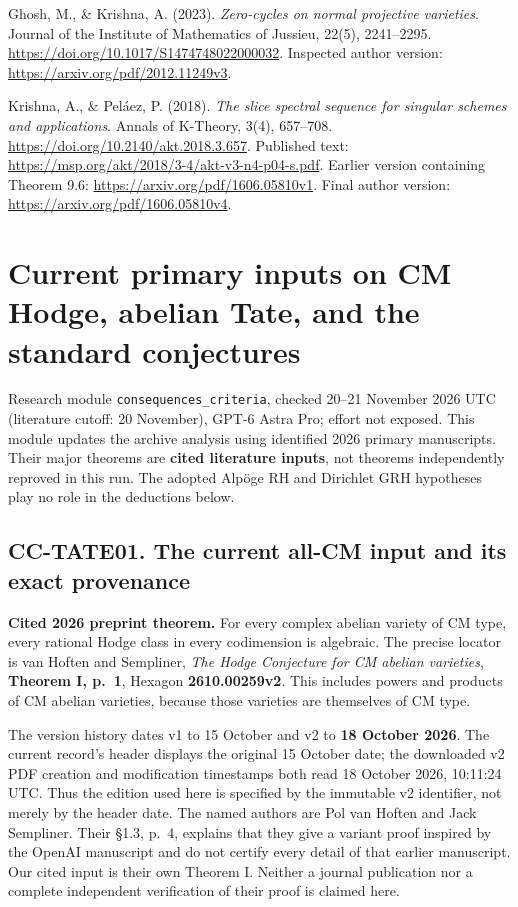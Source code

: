 \documentclass[11pt,a4paper]{article}
\theoremstyle{definition}\newtheorem{definition}[theorem]{Definition}
\theoremstyle{remark}\newtheorem{remark}[theorem]{Remark}
\begin{document}
Ghosh, M., \& Krishna, A. (2023).
\emph{Zero-cycles on normal projective varieties}.
Journal of the Institute of Mathematics of Jussieu, 22(5), 2241--2295.
\url{https://doi.org/10.1017/S1474748022000032}.
Inspected author version:
\url{https://arxiv.org/pdf/2012.11249v3}.

Krishna, A., \& Pel\'aez, P. (2018).
\emph{The slice spectral sequence for singular schemes and applications}.
Annals of K-Theory, 3(4), 657--708.
\url{https://doi.org/10.2140/akt.2018.3.657}.
Published text:
\url{https://msp.org/akt/2018/3-4/akt-v3-n4-p04-s.pdf}.
Earlier version containing Theorem 9.6:
\url{https://arxiv.org/pdf/1606.05810v1}.
Final author version:
\url{https://arxiv.org/pdf/1606.05810v4}.


\section{Current primary inputs on CM Hodge, abelian Tate, and the
standard
conjectures}\label{current-primary-inputs-on-cm-hodge-abelian-tate-and-the-standard-conjectures}

Research module \nolinkurl{consequences_criteria}, checked 20--21 November
2026 UTC (literature cutoff: 20 November), GPT-6 Astra Pro; effort not
exposed. This module updates the archive analysis using identified 2026
primary manuscripts. Their major theorems are \textbf{cited literature
inputs}, not theorems independently reproved in this run. The adopted
Alpöge RH and Dirichlet GRH hypotheses play no role in the deductions
below.

\subsection{CC-TATE01. The current all-CM input and its exact
provenance}\label{cc-tate01.-the-current-all-cm-input-and-its-exact-provenance}

\textbf{Cited 2026 preprint theorem.} For every complex abelian variety
of CM type, every rational Hodge class in every codimension is
algebraic. The precise locator is van Hoften and Sempliner, \emph{The
Hodge Conjecture for CM abelian varieties}, \textbf{Theorem I, p.~1},
Hexagon \textbf{2610.00259v2}. This includes powers and products of CM
abelian varieties, because those varieties are themselves of CM type.

The version history dates v1 to 15 October and v2 to \textbf{18 October
2026}. The current record's header displays the original 15 October
date; the downloaded v2 PDF creation and modification timestamps both
read 18 October 2026, 10:11:24 UTC. Thus the edition used here is
specified by the immutable v2 identifier, not merely by the header date.
The named authors are Pol van Hoften and Jack Sempliner. Their §1.3,
p.~4, explains that they give a variant proof inspired by the OpenAI
manuscript and do not certify every detail of that earlier manuscript.
Our cited input is their own Theorem I. Neither a journal publication
nor a complete independent verification of their proof is claimed here.
\end{document}
